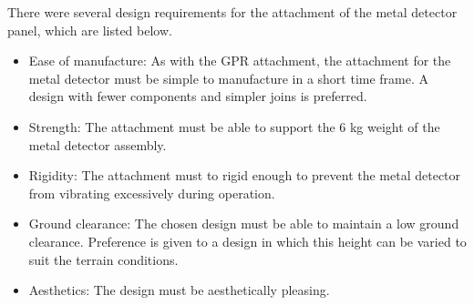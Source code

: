 \documentclass[main.tex]{subfiles}
\begin{document}
There were several design requirements for the attachment of the metal detector panel, which are listed below. 

\begin{itemize}
\item Ease of manufacture: As with the GPR attachment, the attachment for the metal detector must be simple to manufacture in a short time frame. A design with fewer components and simpler joins is preferred.
\item Strength: The attachment must be able to support the 6 kg weight of the metal detector assembly. 
\item Rigidity: The attachment must to rigid enough to prevent the metal detector from vibrating excessively during operation.   
\item Ground clearance: The chosen design must be able to maintain a low ground clearance. Preference is given to a design in which this height can be varied to suit the terrain conditions. 
\item Aesthetics: The design must be aesthetically pleasing. 
\end{itemize}
\end{document}
